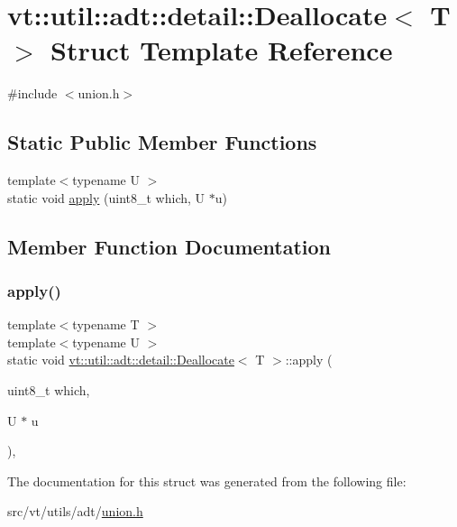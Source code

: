 \hypertarget{structvt_1_1util_1_1adt_1_1detail_1_1_deallocate_3_01_t_01_4}{}\section{vt\+:\+:util\+:\+:adt\+:\+:detail\+:\+:Deallocate$<$ T $>$ Struct Template Reference}
\label{structvt_1_1util_1_1adt_1_1detail_1_1_deallocate_3_01_t_01_4}


{\ttfamily \#include $<$union.\+h$>$}

\subsection*{Static Public Member Functions}
\begin{DoxyCompactItemize}
\item 
{\footnotesize template$<$typename U $>$ }\\static void \hyperlink{structvt_1_1util_1_1adt_1_1detail_1_1_deallocate_3_01_t_01_4_a975c2877153f3126ee2ce5bbe9312c46}{apply} (uint8\+\_\+t which, U $\ast$u)
\end{DoxyCompactItemize}


\subsection{Member Function Documentation}
\mbox{\label{structvt_1_1util_1_1adt_1_1detail_1_1_deallocate_3_01_t_01_4_a975c2877153f3126ee2ce5bbe9312c46}} 
\subsubsection{\texorpdfstring{apply()}{apply()}}
{\footnotesize\ttfamily template$<$typename T $>$ \\
template$<$typename U $>$ \\
static void \hyperlink{structvt_1_1util_1_1adt_1_1detail_1_1_deallocate}{vt\+::util\+::adt\+::detail\+::\+Deallocate}$<$ T $>$\+::apply (\begin{DoxyParamCaption}\item[{uint8\+\_\+t}]{which,  }\item[{U $\ast$}]{u }\end{DoxyParamCaption})\hspace{0.3cm}{\ttfamily [inline]}, {\ttfamily [static]}}



The documentation for this struct was generated from the following file\+:\begin{DoxyCompactItemize}
\item 
src/vt/utils/adt/\hyperlink{union_8h}{union.\+h}\end{DoxyCompactItemize}
